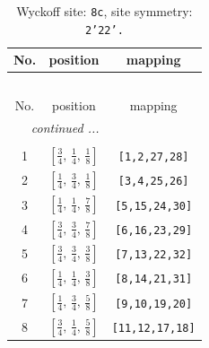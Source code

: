 \documentclass[fleqn,8pt]{jsarticle}
\begin{document}
\begin{longtable}{ccc}
\caption{Wyckoff site: {\tt 8c}, site symmetry: {\tt 2'22'.}}
 \\
 \hline \hline
No. & position & mapping \\ \hline \endfirsthead

\multicolumn{2}{l}{\tablename\ \thetable{}} \\
 \hline \hline
No. & position & mapping \\ \hline \endhead

 \hline \hline
\multicolumn{2}{r}{\footnotesize\it continued ...} \\ \endfoot

 \hline \hline
\multicolumn{2}{r}{} \\ \endlastfoot

1 & $\left[ \frac{3}{4},\, \frac{1}{4},\, \frac{1}{8} \right]$ & {\tt [1,2,27,28]} \\ \hline
2 & $\left[ \frac{1}{4},\, \frac{3}{4},\, \frac{1}{8} \right]$ & {\tt [3,4,25,26]} \\ \hline
3 & $\left[ \frac{1}{4},\, \frac{1}{4},\, \frac{7}{8} \right]$ & {\tt [5,15,24,30]} \\ \hline
4 & $\left[ \frac{3}{4},\, \frac{3}{4},\, \frac{7}{8} \right]$ & {\tt [6,16,23,29]} \\ \hline
5 & $\left[ \frac{3}{4},\, \frac{3}{4},\, \frac{3}{8} \right]$ & {\tt [7,13,22,32]} \\ \hline
6 & $\left[ \frac{1}{4},\, \frac{1}{4},\, \frac{3}{8} \right]$ & {\tt [8,14,21,31]} \\ \hline
7 & $\left[ \frac{1}{4},\, \frac{3}{4},\, \frac{5}{8} \right]$ & {\tt [9,10,19,20]} \\ \hline
8 & $\left[ \frac{3}{4},\, \frac{1}{4},\, \frac{5}{8} \right]$ & {\tt [11,12,17,18]} \\
\end{longtable}
\renewcommand{\arraystretch}{1.2}
\end{document}

